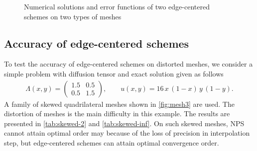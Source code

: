 \documentclass[times,review,preprint,authoryear]{elsarticle}
\begin{document}
\begin{figure}[h]
\caption{Numerical solutions and error functions of two edge-centered schemes on two types of meshes}
\label{fig:solution}
\end{figure}

\subsection{Accuracy of edge-centered schemes}

To test the accuracy of edge-centered schemes on distorted meshes, we consider a simple problem with diffusion tensor and exact solution given as follows
\begin{align*}
\Lambda(x,y) =
\left(
\begin{matrix}
1.5 & 0.5 \\
0.5 & 1.5
\end{matrix}
\right),
\qquad
u(x,y) = 16 \, x \, (1-x) \, y \, (1-y).
\end{align*}
A family of skewed quadrilateral meshes shown in \cref{fig:mesh3} are used. The distortion of meshes is the main difficulty in this example. The results are presented in \cref{tab:skewed-2} and \cref{tab:skewed-inf}.
On such skewed meshes, NPS cannot attain optimal order may because of the loss of precision in interpolation step, but edge-centered schemes can attain optimal convergence order.
\end{document}
